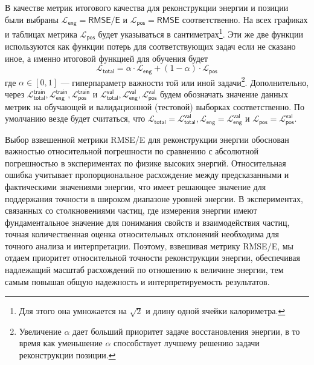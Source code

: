 \documentclass[a4paper,12pt]{extarticle}
\begin{document}
В качестве метрик итогового качества для реконструкции энергии и позиции были выбраны $\mathcal{L}_{\mathsf{eng}} = \textsf{RMSE/E}$ и $\mathcal{L}_{\mathsf{pos}} = \textsf{RMSE}$ соответственно. На всех графиках и таблицах метрика $\mathcal{L}_{\mathsf{pos}}$ будет указываться в сантиметрах\footnote{Для этого она умножается на $\sqrt{2}$ и длину одной ячейки калориметра.}. Эти же две функции используются как функции потерь для соответствующих задач если не сказано иное, а именно итоговой функцией для обучения будет \begin{equation}\label{eq:loss_total}
    \mathcal{L}_{\mathsf{total}} = \alpha \cdot \mathcal{L}_{\mathsf{eng}} + (1 - \alpha) \cdot \mathcal{L}_{\mathsf{pos}}
\end{equation} где $\alpha \in [0, 1]$ --- гиперпараметр важности той или иной задачи\footnote{Увеличение $\alpha$ дает больший приоритет задаче восстановления энергии, в то время как уменьшение $\alpha$ способствует лучшему решению задачи реконструкции позиции.}. Дополнительно, через $\mathcal{L}_{\mathsf{total}}^{\mathsf{train}}, \mathcal{L}_{\mathsf{eng}}^{\mathsf{train}}, \mathcal{L}_{\mathsf{pos}}^{\mathsf{train}}$ и $\mathcal{L}_{\mathsf{total}}^{\mathsf{val}}, \mathcal{L}_{\mathsf{eng}}^{\mathsf{val}}, \mathcal{L}_{\mathsf{pos}}^{\mathsf{val}}$ будем обозначать значение данных метрик на обучающей и валидационной (тестовой) выборках соответственно. По умолчанию везде будет считаться, что $\mathcal{L}_{\mathsf{total}} = \mathcal{L}_{\mathsf{total}}^{\mathsf{val}}, \mathcal{L}_{\mathsf{eng}} = \mathcal{L}_{\mathsf{eng}}^{\mathsf{val}}$ и $\mathcal{L}_{\mathsf{pos}} = \mathcal{L}_{\mathsf{pos}}^{\mathsf{val}}$.

Выбор взвешенной метрики \textsf{RMSE/E} для реконструкции энергии обоснован важностью относительной погрешности по сравнению с абсолютной погрешностью в экспериментах по физике высоких энергий. Относительная ошибка учитывает пропорциональное расхождение между предсказанными и фактическими значениями энергии, что имеет решающее значение для поддержания точности в широком диапазоне уровней энергии. В экспериментах, связанных со столкновениями частиц, где измерения энергии имеют фундаментальное значение для понимания свойств и взаимодействия частиц, точная количественная оценка относительных отклонений необходима для точного анализа и интерпретации. Поэтому, взвешивая метрику \textsf{RMSE/E}, мы отдаем приоритет относительной точности реконструкции энергии, обеспечивая надлежащий масштаб расхождений по отношению к величине энергии, тем самым повышая общую надежность и интерпретируемость результатов.
\end{document}
